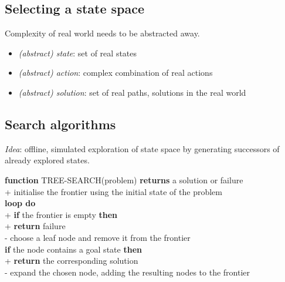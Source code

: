 \documentclass{article}
\begin{document}
\subsection{Selecting a state space}

Complexity of real world needs to be abstracted away.
\begin{itemize}
	\item \emph{(abstract) state}: set of real states
	\item \emph{(abstract) action}: complex combination of real actions
	\item \emph{(abstract) solution}: set of real paths, solutions in the real world
\end{itemize}

\subsection{Search algorithms}

\emph{Idea}: offline, simulated exploration of state space by generating successors of already
explored states.

\begin{pseudo}
	\textbf{function} TREE-SEARCH(problem) \textbf{returns} a solution or failure   \\+
	initialise the frontier using the initial state of the problem              \\
	\textbf{loop do}                                                            \\+
	\textbf{if} the frontier is empty \textbf{then}                          \\+
	\textbf{return} failure                                             \\-
	choose a leaf node and remove it from the frontier                      \\
	\textbf{if} the node contains a goal state \textbf{then}                \\+
	\textbf{return} the corresponding solution                          \\-
	expand the chosen node, adding the resulting nodes to the frontier
\end{pseudo}
\end{document}
